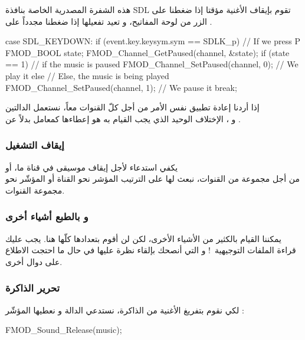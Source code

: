 هذه الشفرة المصدرية الخاصة بنافذة
\textenglish{SDL}
تقوم بإيقاف الأغنية مؤقتا إذا ضغطنا على الزر
من لوحة المفاتيح، و تعيد تفعيلها إذا ضغطنا مجدداً على
.

\begin{Csource}
case SDL_KEYDOWN:
if (event.key.keysym.sym == SDLK_p) // If we press P
{
	FMOD_BOOL state;
	FMOD_Channel_GetPaused(channel, &state);
	if (state == 1) // if the music is paused
		FMOD_Channel_SetPaused(channel, 0); // We play it
	else // Else, the music is being played
		FMOD_Channel_SetPaused(channel, 1); // We pause it
}
break;
\end{Csource}

 إذا أردنا إعادة تطبيق نفس الأمر من أجل كلّ القنوات معاً، نستعمل الدالتين\\
 و
،
الإختلاف الوحيد الذي يجب القيام به هو إعطاءها كمعامل
بدلاً عن 
.

\subsubsection{إيقاف التشغيل}

يكفي استدعاء
لأجل إيقاف موسيقى في قناة ما، أو\\
من أجل مجموعة من القنوات، نبعث لها على الترتيب المؤشر نحو القناة أو المؤشّر نحو مجموعة القنوات.

\subsubsection{و بالطبع أشياء أخرى}

يمكننا القيام بالكثير من الأشياء الأخرى، لكن لن أقوم بتعدادها كلّها هنا. يجب عليك قراءة الملفات التوجيهية~! و التي أنصحك بإلقاء نظرة عليها في حال ما احتجت الاطلاع على دوال أخرى.

\subsubsection{تحرير الذاكرة}

لكي نقوم بتفريغ الأغنية من الذاكرة، نستدعي الدالة
و نعطيها المؤشّر :

\begin{Csource}
FMOD_Sound_Release(music);
\end{Csource}

